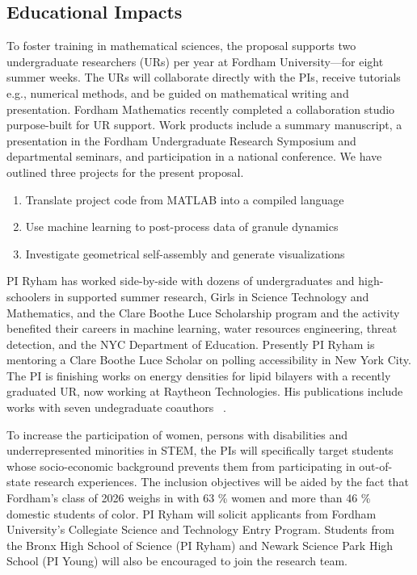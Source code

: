 \subsection{Educational Impacts}
\label{subsec:Educational_plans}
To foster training in mathematical sciences,
the proposal supports two undergraduate researchers
(URs) per year at Fordham University---for eight summer weeks.
The URs will collaborate directly with the PIs,
receive tutorials e.g., numerical methods,
and be guided on mathematical writing and presentation.
Fordham Mathematics recently completed a collaboration studio 
purpose-built for UR support.
Work products include a summary manuscript,
a presentation in the Fordham Undergraduate Research Symposium
and departmental seminars, and participation in a national conference.
We have outlined three projects for the present proposal.
\begin{enumerate}[noitemsep,topsep=0pt]
\item Translate project code from MATLAB into a compiled language 
\item Use machine learning to post-process data of granule dynamics
\item Investigate geometrical self-assembly and generate visualizations
\end{enumerate}
PI Ryham has worked side-by-side with dozens of
undergraduates and high-schoolers in
supported summer research, Girls in Science Technology and Mathematics,
and the Clare Boothe Luce Scholarship program
and the activity benefited their careers in
machine learning, water resources engineering, threat detection,
and the NYC Department of Education.
Presently PI Ryham is mentoring a Clare Boothe Luce Scholar on
polling accessibility in New York City.
The PI is finishing works on energy densities for lipid  bilayers
with a recently graduated UR, now working at Raytheon Technologies.
His publications include works
with seven undegraduate coauthors
~\cite{Figueroa2012CuttingCI, RYHAM20112929, RyWaCo13, RyKlYaCo16}.


To increase the participation of women,
persons with disabilities and underrepresented minorities in STEM,
the PIs will specifically target students
whose socio-economic background prevents them from participating in
out-of-state research experiences.
The inclusion objectives will be aided by the fact that  
Fordham's class of 2026 weighs in with 63 \% women
and more than 46 \% domestic students of color. 
PI Ryham will solicit applicants from
Fordham University's Collegiate Science and Technology Entry Program.
Students from the Bronx High School of Science (PI Ryham) and Newark
Science Park High School (PI Young) will also be encouraged to join the
research team. 

